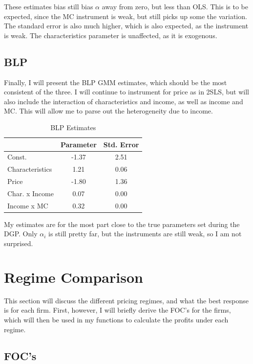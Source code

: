 \documentclass[11pt]{article}
\theoremstyle{definition}
\theoremstyle{remark}
\begin{document}
These estimates bias still bias $\alpha$ away from zero, but less than OLS. This is to be expected, since the MC instrument is weak, but still picks 
up some the variation. The standard error is also much higher, which is also expected, as the instrument is weak. The characteristics parameter is unaffected, as it is exogenous.

\subsection{BLP}

Finally, I will present the BLP GMM estimates, which should be the most consistent of the three. I will continue to instrument for price as in 2SLS, but will also
include the interaction of characteristics and income, as well as income and MC. This will allow me to parse out the heterogeneity due to income.

\begin{table}
\centering
\begin{tabular}{lcc}
\toprule
  & Parameter & Std. Error \\
\midrule
  Const. & -1.37 &  2.51 \\
  Characteristics & 1.21 & 0.06 \\
  Price & -1.80 &  1.36 \\
  Char. x Income & 0.07 & 0.00 \\
  Income x MC & 0.32 & 0.00 \\
\bottomrule
\end{tabular}
\caption{BLP Estimates}
\end{table}

My estimates are for the most part close to the true parameters set during the DGP.
Only $\alpha_i$ is still pretty far, but the instruments are still weak, so I am not
surprised.

\section{Regime Comparison}

This section will discuss the different pricing regimes, and what the best response is for each firm. First, however, I will 
briefly derive the FOC's for the firms, which will then be used in my functions to calculate the profits under each regime.

\subsection{FOC's}
\end{document}
